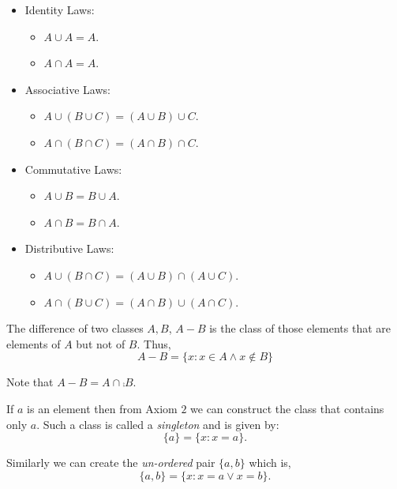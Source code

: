 \begin{itemize}
    \item Identity Laws:
	\begin{itemize}
	    \item $A \cup A = A$.
	    \item $A \cap A = A$.
	\end{itemize}
    \item Associative Laws:
	\begin{itemize}
	    \item $A \cup ( B \cup C) = (A \cup B)\cup C $.
	    \item $A \cap ( B \cap C) = (A \cap B)\cap C $.
	\end{itemize}
    \item Commutative Laws:
	\begin{itemize}
	    \item $A \cup B = B \cup A$.
	    \item $A \cap B = B \cap A$.
	\end{itemize}
    \item Distributive Laws:
	\begin{itemize}
	    \item $A \cup (B \cap C) = (A \cup B) \cap (A \cup C)$.
	    \item $A \cap (B \cup C) = (A \cap B) \cup (A \cap C)$.
	\end{itemize}
\end{itemize}

\begin{Definition}
    The difference of two classes $A,B$, $A - B$ is the class of those elements that are elements of $A$ but
    not of $B$. Thus,
    \begin{equation*}
	A - B = \left.\lbrace x : x \in A \land x \not\in B \rbrace\right.
    \end{equation*}
\end{Definition}
Note that $A - B = A \cap \comp{B}$.

If $a$ is an element then from Axiom $2$ we can construct the class that contains only $a$. Such a
class is called a \textit{singleton} and is given by:
\begin{equation*}
    \lbrace a \rbrace =\lbrace x : x = a \rbrace.
\end{equation*}

Similarly we can create the \textit{un-ordered} pair $\lbrace a,b \rbrace$ which is,
\begin{equation*}
    \lbrace a,b \rbrace = \lbrace x : x = a \lor x = b \rbrace.
\end{equation*}

